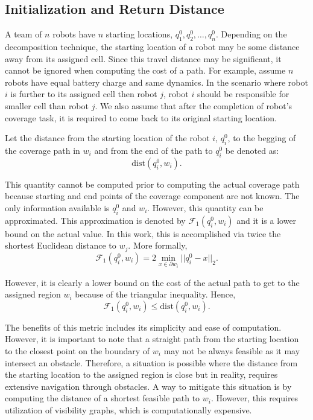 \documentclass[../main.tex]{subfiles}
\begin{document}
\subsection{Initialization and Return Distance}
\label{subsection:init_ret_distance}

A team of $n$ robots have $n$ starting locations, $q^0_1,q^0_2,\ldots,q^0_n$. Depending on the decomposition technique, the starting location of a robot may be some distance away from its assigned cell. Since this travel distance may be significant, it cannot be ignored when computing the cost of a path. For example, assume $n$ robots have equal battery charge and same dynamics. In the scenario where robot $i$ is further to its assigned cell then robot $j$, robot $i$ should be responsible for smaller cell than robot $j$. We also assume that after the completion of robot's coverage task, it is required to come back to its original starting location.

Let the distance from the starting location of the robot $i$, $q^0_i$, to the begging of the coverage path in $w_i$ and from the end of the path to $q^0_i$ be denoted as:
\begin{equation}
	\text{dist}(q^0_i,w_i).
\end{equation}

This quantity cannot be computed prior to computing the actual coverage path because starting and end points of the coverage component are not known. The only information available is $q^0_i$ and $w_i$. However, this quantity can be approximated. This approximation is denoted by $\mathcal{F}_1(q^0_i,w_i)$ and it is a lower bound on the actual value. In this work, this is accomplished via twice the shortest Euclidean distance to $w_j$. More formally, 
\begin{equation}
	\mathcal{F}_1(q^0_i,w_i)=2\min_{x\in\partial w_i}||q^0_i-x||_2.
\end{equation}

However, it is clearly a lower bound on the cost of the actual path to get to the assigned region $w_i$ because of the triangular inequality. Hence,
\begin{equation}
	\mathcal{F}_1(q^0_i,w_i)\leq\text{dist}(q^0_i,w_i).
\end{equation}

The benefits of this metric includes its simplicity and ease of computation. However, it is important to note that a straight path from the starting location to the closest point on the boundary of $w_i$ may not be always feasible as it may intersect an obstacle. Therefore, a situation is possible where the distance from the starting location to the assigned region is close but in reality, requires extensive navigation through obstacles. A way to mitigate this situation is by computing the distance of a shortest feasible path to $w_i$. However, this requires utilization of visibility graphs, which is computationally expensive.
\end{document}
